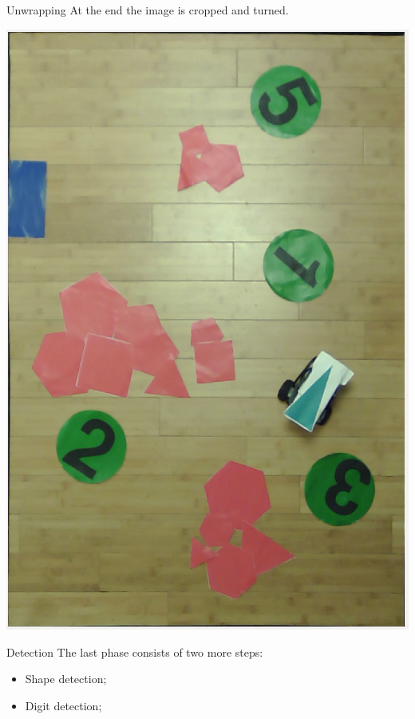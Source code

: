 \begin{frame}[fragile]{Unwrapping}
	At the end the image is cropped and turned. 
	\begin{center}
		\includegraphics[scale=0.19]{Immagini/Unwrapped}
	\end{center}
\end{frame}


\begin{frame}[fragile]{Detection}
	The last phase consists of two more steps:
	\begin{itemize}
		\item Shape detection;
		\item Digit detection;
	\end{itemize}
\end{frame}

